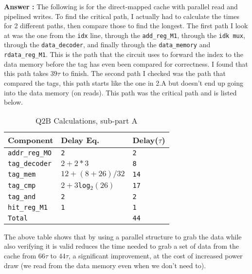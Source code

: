 \documentclass[a4paper,11pt]{article}
\newcommand{\answer}{\textbf{Answer : }}
\newcommand{\T}{\texttt}
\newcommand{\V}{\verb}
\begin{document}
\answer The following is for the direct-mapped cache with parallel read and pipelined writes. To find the critical path, I actually had to calculate the times for 2 different paths, then compare those to find the longest. The first path I look at was the one from the \T{idx} line, through the \V.add_reg_M1., through the \V.idk mux., through the \V.data_decoder., and finally through the \V.data_memory. and \V.rdata_reg_M1.. This is the path that the circuit uses to forward the index to the data memory before the tag has even been compared for correctness. I found that this path takes $39\tau$ to finish. The second path I checked was the path that compared the tags, this path starts like the one in 2.A but doesn't end up going into the data memory (on reads). This path was the critical path and is listed below.

\begin{table}[H]
\caption{Q2B Calculations, sub-part A} \label{tab:q2Btable1} 
\begin{center}
\begin{tabular}{| l | l | l |}
\hline
  Component         &  Delay Eq.              & Delay($\tau$)          \\ \hline
  \V.addr_reg_MO.   &   \T{2}                 & \T{2}                  \\ \hline
  \V.tag_decoder.   &   \T{$2+2*3$}           & \T{8}                  \\ \hline
  \V.tag_mem.       &   \T{$12+(8+26)/32$}    & \T{14}                 \\ \hline
  \V.tag_cmp.       &   \T{$2+3$log$_2(26)$}  & \T{17}                 \\ \hline
  \V.tag_and.       &   \T{2}                 & \T{2}                  \\ \hline
  \V.hit_reg_M1.    &   \T{1}                 & \T{1}                  \\ \hline
  \V.Total.         &   \T{}                  & \T{44}                 \\ \hline
\end{tabular}
\end{center}
\end{table}

The above table shows that by using a parallel structure to grab the data while also verifying it is valid reduces the time needed to grab a set of data from the cache from $66\tau$ to $44\tau$, a significant improvement, at the cost of increased power draw (we read from the data memory even when we don't need to).
\end{document}
